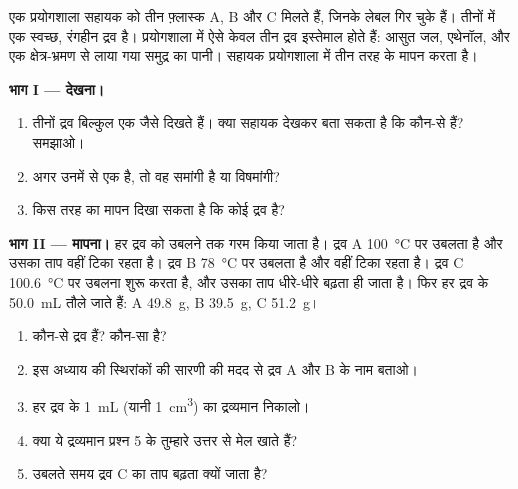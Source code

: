 \begin{problem}
\label{pb:g6:pure-substances-and-mixtures:1}
एक प्रयोगशाला सहायक को तीन फ़्लास्क A, B और C मिलते हैं, जिनके लेबल
गिर चुके हैं। तीनों में एक स्वच्छ, रंगहीन द्रव है। प्रयोगशाला में ऐसे केवल
तीन द्रव इस्तेमाल होते हैं: आसुत जल, एथेनॉल, और एक क्षेत्र-भ्रमण से लाया गया
समुद्र का पानी। सहायक प्रयोगशाला में तीन तरह के
मापन करता है।

\medskip
\noindent\textbf{भाग I --- देखना।}
\begin{enumerate}
  \item तीनों द्रव बिल्कुल एक जैसे दिखते हैं। क्या सहायक देखकर बता सकता
        है कि कौन-से  हैं? समझाओ।
  \item अगर उनमें से एक  है, तो वह समांगी है या विषमांगी?
  \item किस तरह का मापन दिखा सकता है कि कोई द्रव  है?
\end{enumerate}

\medskip
\noindent\textbf{भाग II --- मापना।}
हर द्रव को उबलने तक गरम किया जाता है। द्रव A \qty{100}{\celsius} पर
उबलता है और उसका ताप वहीं टिका रहता है। द्रव B \qty{78}{\celsius} पर उबलता
है और वहीं टिका रहता है। द्रव C \qty{100.6}{\celsius} पर उबलना शुरू करता
है, और उसका ताप धीरे-धीरे बढ़ता ही जाता है। फिर हर द्रव के
\qty{50.0}{mL} तौले जाते हैं: A \qty{49.8}{g}, B
\qty{39.5}{g}, C \qty{51.2}{g}।
\begin{enumerate}[resume]
  \item कौन-से द्रव  हैं? कौन-सा  है?
  \item इस अध्याय की स्थिरांकों की सारणी की मदद से द्रव A और
        B के नाम बताओ।
  \item हर द्रव के \qty{1}{mL} (यानी \qty{1}{cm^3}) का द्रव्यमान
        निकालो।
  \item क्या ये द्रव्यमान प्रश्न 5 के तुम्हारे उत्तर से मेल खाते हैं?
  \item उबलते समय द्रव C का ताप बढ़ता क्यों जाता है?
\end{enumerate}


\end{problem}
